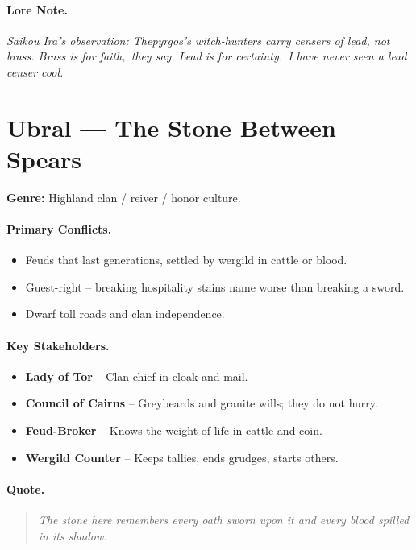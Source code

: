\paragraph{Lore Note.}
\emph{Saikou Ira's observation: \textquotedbl Thepyrgos's witch-hunters carry censers of lead, not brass. \textquotedbl Brass is for faith,\textquotedbl\ they say. \textquotedbl Lead is for certainty.\textquotedbl\ I have never seen a lead censer cool.\textquotedbl}

\section{Ubral --- \textquotedbl The Stone Between Spears\textquotedbl}
\textbf{Genre:} Highland clan / reiver / honor culture.

\paragraph{Primary Conflicts.}
\begin{itemize}
  \item Feuds that last generations, settled by wergild in cattle or blood.
  \item Guest-right -- breaking hospitality stains name worse than breaking a sword.
  \item Dwarf toll roads and clan independence.
\end{itemize}

\paragraph{Key Stakeholders.}
\begin{itemize}
  \item \textbf{Lady of Tor} -- Clan-chief in cloak and mail.
  \item \textbf{Council of Cairns} -- Greybeards and granite wills; they do not hurry.
  \item \textbf{Feud-Broker} -- Knows the weight of life in cattle and coin.
  \item \textbf{Wergild Counter} -- Keeps tallies, ends grudges, starts others.
\end{itemize}

\paragraph{Quote.}
\begin{quote}
\emph{\textquotedbl The stone here remembers every oath sworn upon it and every blood spilled in its shadow.\textquotedbl}
\end{quote}

